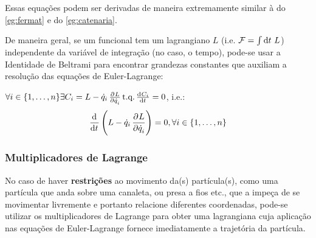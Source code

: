 Essas equações podem ser derivadas de maneira extremamente similar à do
\autoref{eg:fermat} e do \autoref{eg:catenaria}. 

De maneira geral, se um funcional tem um lagrangiano $L$ (i.e. $\mathcal{F}=\int
\dif t~L$) independente da variável de integração (no caso, o tempo), pode-se
usar a Identidade de Beltrami para encontrar grandezas constantes que auxiliam
a resolução das equações de Euler-Lagrange:

\begin{namedeq}
    $\forall i \in \{1, \ldots, n\} \exists C_i = L - \dot q_i \tpd{L}{\dot
    q_i} \text{t.q.} \tod{C_i}{t} = 0$, i.e.:
    \begin{equation*}
        \label{eq:beltrami}
        \dod{}{t} \del{L - \dot q_i \dpd{L}{\dot q_i}} = 0, \forall i \in \{1, 
        \ldots, n\}
    \end{equation*}
\end{namedeq}

\subsubsection{Multiplicadores de Lagrange}
\label{sssec:lagrange_multipliers}

No caso de haver \textbf{restrições} ao movimento da(s) partícula(s), como uma
partícula que anda sobre uma canaleta, ou presa a fios etc., que a impeça de se
movimentar livremente e portanto relacione diferentes coordenadas, pode-se
utilizar os multiplicadores de Lagrange para obter uma lagrangiana cuja
aplicação nas equações de Euler-Lagrange fornece imediatamente a trajetória da
partícula.

